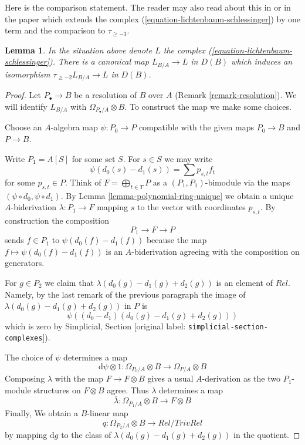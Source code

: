 \documentclass[10pt,a4paper]{article}
\theoremstyle{plain}
\newtheorem{lemma}[subsection]{Lemma}
\theoremstyle{definition}
\theoremstyle{remark}
\numberwithin{equation}{subsection}
\begin{document}
\noindent
Here is the comparison statement. The reader may also read about this
in \cite[page 206, Proposition 12]{Andre-Homologie} or in the paper
\cite{Doncel} which extends the complex
(\ref{equation-lichtenbaum-schlessinger}) by one term and the comparison
to $\tau_{\geq -3}$.

\begin{lemma}
\label{lemma-compare-higher}
In the situation above denote $L$ the complex
(\ref{equation-lichtenbaum-schlessinger}).
There is a canonical map $L_{B/A} \to L$ in $D(B)$ which
induces an isomorphism $\tau_{\geq -2}L_{B/A} \to L$ in $D(B)$.
\end{lemma}

\begin{proof}
Let $P_\bullet \to B$ be a resolution of $B$ over $A$
(Remark \ref{remark-resolution}). We will identify $L_{B/A}$ with
$\Omega_{P_\bullet/A} \otimes B$. To construct the map we
make some choices.

\medskip\noindent
Choose an $A$-algebra map $\psi : P_0 \to P$ compatible with the
given maps $P_0 \to B$ and $P \to B$.

\medskip\noindent
Write $P_1 = A[S]$ for some set $S$. For $s \in S$ we may write
$$
\psi(d_0(s) - d_1(s)) = \sum p_{s, t} f_t
$$
for some $p_{s, t} \in P$. Think of $F = \bigoplus_{t \in T} P$
as a $(P_1, P_1)$-bimodule via the maps $(\psi \circ d_0, \psi \circ d_1)$.
By Lemma \ref{lemma-polynomial-ring-unique} we obtain a unique
$A$-biderivation $\lambda : P_1 \to F$ mapping $s$ to the vector with
coordinates $p_{s, t}$. By construction the composition
$$
P_1 \longrightarrow F \longrightarrow P
$$
sends $f \in P_1$ to $\psi(d_0(f) - d_1(f))$ because the map
$f \mapsto \psi(d_0(f) - d_1(f))$ is an $A$-biderivation agreeing with
the composition on generators.

\medskip\noindent
For $g \in P_2$ we claim that $\lambda(d_0(g) - d_1(g) + d_2(g))$
is an element of $Rel$. Namely, by the last remark of the previous
paragraph the image of $\lambda(d_0(g) - d_1(g) + d_2(g))$ in $P$ is
$$
\psi((d_0 - d_1)(d_0(g) - d_1(g) + d_2(g)))
$$
which is zero by Simplicial, Section \textnormal{[original label: \nolinkurl{simplicial-section-complexes}]}).

\medskip\noindent
The choice of $\psi$ determines a map
$$
\text{d}\psi \otimes 1 :
\Omega_{P_0/A} \otimes B
\longrightarrow
\Omega_{P/A} \otimes B
$$
Composing $\lambda$ with the map $F \to F \otimes B$ gives a
usual $A$-derivation as the two $P_1$-module structures on
$F \otimes B$ agree. Thus $\lambda$ determines a map
$$
\overline{\lambda} :
\Omega_{P_1/A} \otimes B
\longrightarrow
F \otimes B
$$
Finally, We obtain a $B$-linear map
$$
q :
\Omega_{P_2/A} \otimes B
\longrightarrow
Rel/TrivRel
$$
by mapping $\text{d}g$ to the class of $\lambda(d_0(g) - d_1(g) + d_2(g))$
in the quotient.


\end{proof}
\end{document}

